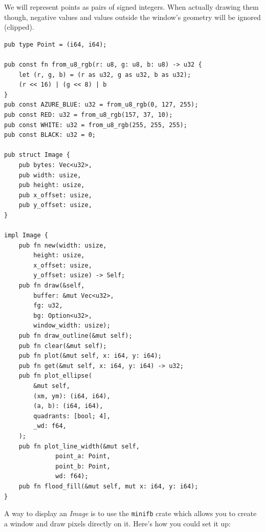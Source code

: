 \documentclass[12pt,a4,oneside,usenames,dvipsnames]{book}
\begin{document}
We will represent points as pairs of signed integers. When actually drawing them though, negative values and values outside the window's geometry will be ignored (clipped).

\begin{verbatim}
pub type Point = (i64, i64);

pub const fn from_u8_rgb(r: u8, g: u8, b: u8) -> u32 {
    let (r, g, b) = (r as u32, g as u32, b as u32);
    (r << 16) | (g << 8) | b
}
pub const AZURE_BLUE: u32 = from_u8_rgb(0, 127, 255);
pub const RED: u32 = from_u8_rgb(157, 37, 10);
pub const WHITE: u32 = from_u8_rgb(255, 255, 255);
pub const BLACK: u32 = 0;

pub struct Image {
    pub bytes: Vec<u32>,
    pub width: usize,
    pub height: usize,
    pub x_offset: usize,
    pub y_offset: usize,
}

impl Image {
    pub fn new(width: usize,
        height: usize,
        x_offset: usize,
        y_offset: usize) -> Self;
    pub fn draw(&self,
        buffer: &mut Vec<u32>,
        fg: u32,
        bg: Option<u32>,
        window_width: usize);
    pub fn draw_outline(&mut self);
    pub fn clear(&mut self);
    pub fn plot(&mut self, x: i64, y: i64);
    pub fn get(&mut self, x: i64, y: i64) -> u32;
    pub fn plot_ellipse(
        &mut self,
        (xm, ym): (i64, i64),
        (a, b): (i64, i64),
        quadrants: [bool; 4],
        _wd: f64,
    );
    pub fn plot_line_width(&mut self,
              point_a: Point,
              point_b: Point,
              wd: f64);
    pub fn flood_fill(&mut self, mut x: i64, y: i64);
}
\end{verbatim}

A way to display an \emph{Image} is to use the \texttt{minifb} crate which allows you to create a window and draw pixels directly on it. Here's how you could set it up:
\end{document}
